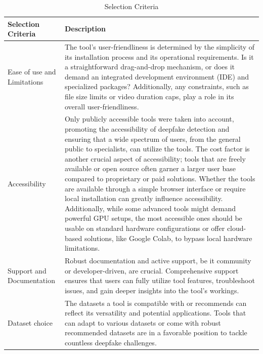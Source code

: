 \begin{table}[htpb]
	\caption{Selection Criteria}\label{tab:selection_criteria}
	\centering
	\small
	\begin{tabularx}{\textwidth}{l X}
		\toprule
		\textbf{Selection Criteria} & \textbf{Description}                       \\
		\midrule
		Ease of use and Limitations & The tool's user-friendliness is determined
		by the simplicity of its installation process and its operational
		requirements. Is it a straightforward drag-and-drop mechanism, or does
		it demand an integrated development environment (\ac{IDE}) and
		specialized packages? Additionally, any constraints, such
		as file size limits or video duration caps, play a role in its overall
		user-friendliness.                                                       \\
		\addlinespace
		Accessibility               & Only publicly accessible tools were taken
		into account, promoting the accessibility of deepfake detection and
		ensuring that a wide spectrum of users, from the general public to
		specialists, can utilize the tools. The cost factor is another crucial
		aspect of accessibility; tools that are freely available or open
		source often garner a larger user base compared to proprietary or paid
		solutions. Whether the tools are available through a simple browser
		interface or require local installation can greatly influence
		accessibility. Additionally, while some advanced tools might demand
		powerful GPU setups, the most accessible ones should be usable on
		standard hardware configurations or offer cloud-based solutions, like
		Google Colab, to bypass local hardware limitations.                      \\
		\addlinespace
		Support and Documentation   & Robust documentation and active support,
		be it community or developer-driven, are crucial. Comprehensive support
		ensures that users can fully utilize tool features, troubleshoot issues,
		and gain deeper insights into the tool's workings.                       \\
		\addlinespace
		Dataset choice              & The datasets a tool is compatible with or
		recommends can reflect its versatility and potential applications.
		Tools that can adapt to various datasets or come with robust recommended
		datasets are in a favorable position to tackle countless deepfake
		challenges.                                                              \\
		\bottomrule
	\end{tabularx}
\end{table}

